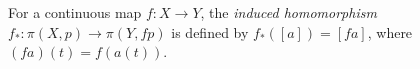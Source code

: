 For a continuous map $f: X \to Y$, the \textit{induced homomorphism} $f_*: \pi(X,p) \to \pi(Y, fp)$ is defined by $f_*([a]) = [fa]$, where $(fa)(t) = f(a(t))$.
